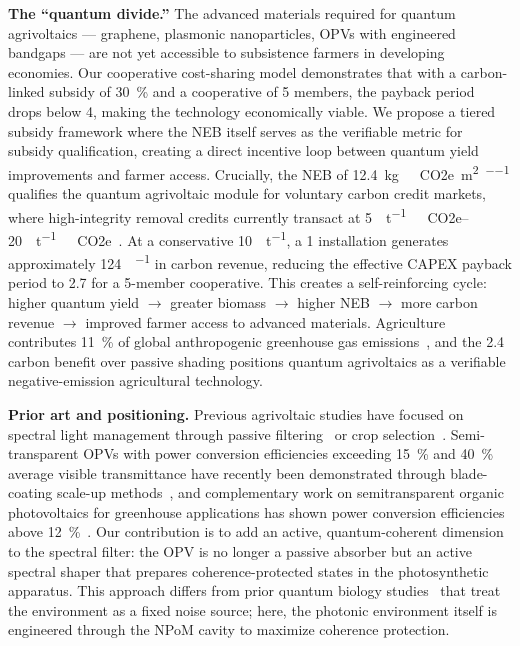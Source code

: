 \documentclass[12pt]{article}
\begin{document}
\textbf{The ``quantum divide.''} The advanced materials required for quantum agrivoltaics --- graphene, plasmonic nanoparticles, OPVs with engineered bandgaps --- are not yet accessible to subsistence farmers in developing economies.
Our cooperative cost-sharing model demonstrates that with a carbon-linked subsidy of \SI{30}{\percent} and a cooperative of 5 members, the payback period drops below \SI{4}{\yr}, making the technology economically viable.
We propose a tiered subsidy framework where the NEB itself serves as the verifiable metric for subsidy qualification, creating a direct incentive loop between quantum yield improvements and farmer access.
Crucially, the NEB of \SI{12.4}{\kg\ CO2e\per\m\squared\per\yr} qualifies the quantum agrivoltaic module for voluntary carbon credit markets, where high-integrity removal credits currently transact at \SIrange{5}{20}{\USD\per\tonne\ CO2e}~\cite{ICVCM2024}. At a conservative \SI{10}{\USD\per\tonne}, a \SI{1}{\ha} installation generates approximately \SI{124}{\USD\per\yr} in carbon revenue, reducing the effective CAPEX payback period to \SI{2.7}{\yr} for a 5-member cooperative. This creates a self-reinforcing cycle: higher quantum yield $\rightarrow$ greater biomass $\rightarrow$ higher NEB $\rightarrow$ more carbon revenue $\rightarrow$ improved farmer access to advanced materials. Agriculture contributes \SI{11}{\percent} of global anthropogenic greenhouse gas emissions~\cite{Tubiello2015}, and the \SI{2.4}{\times} carbon benefit over passive shading positions quantum agrivoltaics as a verifiable negative-emission agricultural technology.

\textbf{Prior art and positioning.} Previous agrivoltaic studies have focused on spectral light management through passive filtering~\cite{Thompson2020} or crop selection~\cite{Dupraz2011}.
Semi-transparent OPVs with power conversion efficiencies exceeding \SI{15}{\percent} and \SI{40}{\percent} average visible transmittance have recently been demonstrated through blade-coating scale-up methods~\cite{Ravishankar2024}, and complementary work on semitransparent organic photovoltaics for greenhouse applications has shown power conversion efficiencies above \SI{12}{\percent}~\cite{Alshareef2024}.
Our contribution is to add an active, quantum-coherent dimension to the spectral filter: the OPV is no longer a passive absorber but an active spectral shaper that prepares coherence-protected states in the photosynthetic apparatus.
This approach differs from prior quantum biology studies~\cite{Scholes2015} that treat the environment as a fixed noise source; here, the photonic environment itself is engineered through the NPoM cavity to maximize coherence protection.
\end{document}
